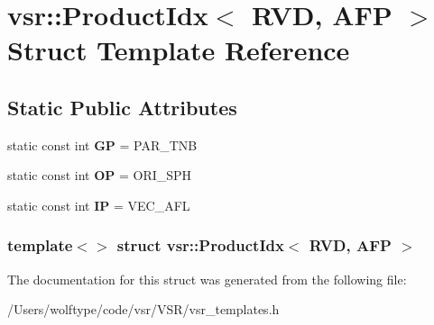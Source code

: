 \hypertarget{structvsr_1_1_product_idx_3_01_r_v_d_00_01_a_f_p_01_4}{\section{vsr\-:\-:Product\-Idx$<$ R\-V\-D, A\-F\-P $>$ Struct Template Reference}
\label{structvsr_1_1_product_idx_3_01_r_v_d_00_01_a_f_p_01_4}
}
\subsection*{Static Public Attributes}
\begin{DoxyCompactItemize}
\item 
\hypertarget{structvsr_1_1_product_idx_3_01_r_v_d_00_01_a_f_p_01_4_a66cf2c09c1c1a3df889ce27542e02022}{static const int {\bfseries G\-P} = P\-A\-R\-\_\-\-T\-N\-B}\label{structvsr_1_1_product_idx_3_01_r_v_d_00_01_a_f_p_01_4_a66cf2c09c1c1a3df889ce27542e02022}

\item 
\hypertarget{structvsr_1_1_product_idx_3_01_r_v_d_00_01_a_f_p_01_4_a0ca67d25edf39d8ddd8917f8129421ae}{static const int {\bfseries O\-P} = O\-R\-I\-\_\-\-S\-P\-H}\label{structvsr_1_1_product_idx_3_01_r_v_d_00_01_a_f_p_01_4_a0ca67d25edf39d8ddd8917f8129421ae}

\item 
\hypertarget{structvsr_1_1_product_idx_3_01_r_v_d_00_01_a_f_p_01_4_aaef580855cc5442fda3d1fbdf3a2a0ec}{static const int {\bfseries I\-P} = V\-E\-C\-\_\-\-A\-F\-L}\label{structvsr_1_1_product_idx_3_01_r_v_d_00_01_a_f_p_01_4_aaef580855cc5442fda3d1fbdf3a2a0ec}

\end{DoxyCompactItemize}
\subsubsection*{template$<$$>$ struct vsr\-::\-Product\-Idx$<$ R\-V\-D, A\-F\-P $>$}



The documentation for this struct was generated from the following file\-:\begin{DoxyCompactItemize}
\item 
/\-Users/wolftype/code/vsr/\-V\-S\-R/vsr\-\_\-templates.\-h\end{DoxyCompactItemize}
